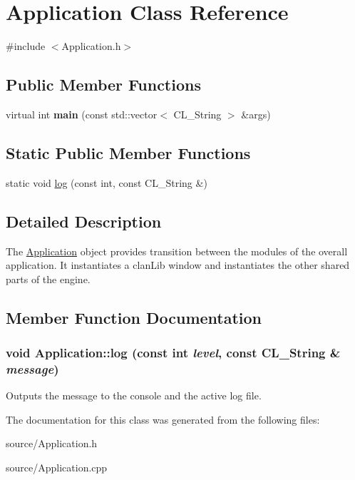 \hypertarget{classApplication}{
\section{Application Class Reference}
\label{classApplication}
}


{\ttfamily \#include $<$Application.h$>$}\subsection*{Public Member Functions}
\begin{DoxyCompactItemize}
\item 
\hypertarget{classApplication_abbda0eddef2dd5fcce957a82373ecb6c}{
virtual int {\bfseries main} (const std::vector$<$ CL\_\-String $>$ \&args)}
\label{classApplication_abbda0eddef2dd5fcce957a82373ecb6c}

\end{DoxyCompactItemize}
\subsection*{Static Public Member Functions}
\begin{DoxyCompactItemize}
\item 
static void \hyperlink{classApplication_a1112e5aede67cff7aad4c8fb4be3e3af}{log} (const int, const CL\_\-String \&)
\end{DoxyCompactItemize}


\subsection{Detailed Description}
The \hyperlink{classApplication}{Application} object provides transition between the modules of the overall application. It instantiates a clanLib window and instantiates the other shared parts of the engine. 

\subsection{Member Function Documentation}
\hypertarget{classApplication_a1112e5aede67cff7aad4c8fb4be3e3af}{
\subsubsection[{log}]{\setlength{\rightskip}{0pt plus 5cm}void Application::log (const int {\em level}, \/  const CL\_\-String \& {\em message})}}
\label{classApplication_a1112e5aede67cff7aad4c8fb4be3e3af}
Outputs the message to the console and the active log file. 

The documentation for this class was generated from the following files:\begin{DoxyCompactItemize}
\item 
source/Application.h\item 
source/Application.cpp\end{DoxyCompactItemize}
